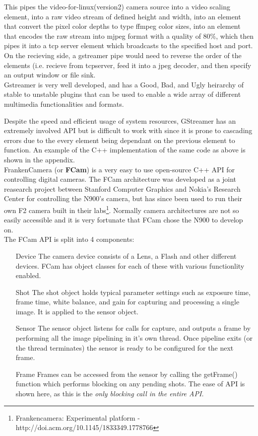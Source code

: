 This pipes the video-for-linux(version2) camera source into a video scaling element, into a raw video stream of defined height and width, into an element that convert the pixel color depths to type ffmpeg color sizes, into an element that encodes the raw stream into mjpeg format with a quality of 80\%, which then pipes it into a tcp server element which broadcasts to the specified host and port.
\\On the recieving side, a gstreamer pipe would need to reverse the order of the elements (i.e. recieve from tcpserver, feed it into a jpeg decoder, and then specify an output window or file sink.
\\Gstreamer is very well developed, and has a Good, Bad, and Ugly heirarchy of stable to unstable plugins that can be used to enable a wide array of different multimedia functionalities and formats.

Despite the speed and efficient usage of system resources, GStreamer has an extremely involved API but is difficult to work with since it is prone to cascading errors due to the every element being dependant on the previous element to function. An example of the C++ implementation of the same code as above is shown in the appendix.\\

FrankenCamera (or {\bf FCam}) is a very easy to use open-source C++ API for controlling digital cameras.  The FCam architecture was developed as a joint reasearch project between Stanford Computer Graphics and Nokia's Research Center for controlling the N900's camera, but has since been used to run their own F2 camera built in their labs\footnote{Frankencamera: Experimental platform - http://doi.acm.org/10.1145/1833349.1778766}\label{ref:fcamdoc}. Normally camera architectures are not so easily accessible and it is very fortunate that FCam chose the N900 to develop on.
\pagebreak
\\The FCam API is split into 4 components:
\begin{enumerate}
\item[Device]{The camera device consists of a Lens, a Flash and other different devices. FCam has object classes for each of these with various functionlity enabled.}
\item[Shot]{The shot object holds typical parameter settings such as exposure time, frame time, white balance, and gain for capturing and processing a single image. It is applied to the sensor object.}
\item[Sensor]{The sensor object listens for calls for capture, and outputs a frame by performing all the image pipelining in it's own thread. Once pipeline exits (or the thread terminates) the sensor is ready to be configured for the next frame.}
\item[Frame]{Frames can be accessed from the sensor by calling the getFrame() function which performs blocking on any pending shots. The ease of API is shown here, as this is the \it{only} blocking call in the entire API.}
\end{enumerate}

